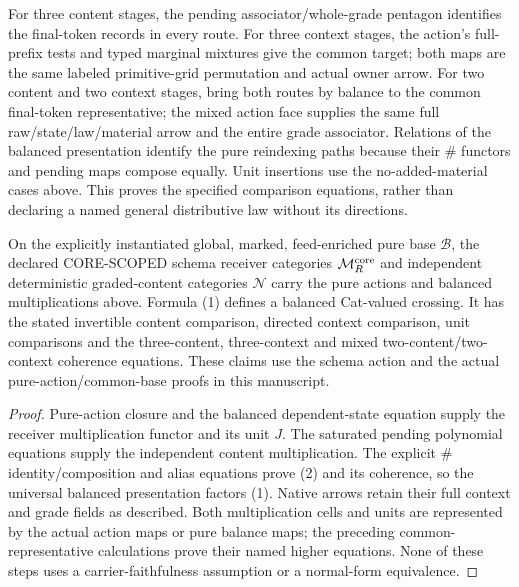 \documentclass[11pt]{article}
\begin{document}
For three content stages, the pending associator/whole-grade pentagon identifies the final-token records in every route. For three context stages, the action's full-prefix tests and typed marginal mixtures give the common target; both maps are the same labeled primitive-grid permutation and actual owner arrow. For two content and two context stages, bring both routes by balance to the common final-token representative; the mixed action face supplies the same full raw/state/law/material arrow and the entire grade associator. Relations of the balanced presentation identify the pure reindexing paths because their $\#$ functors and pending maps compose equally. Unit insertions use the no-added-material cases above. This proves the specified comparison equations, rather than declaring a named general distributive law without its directions.

\begin{theorem}
On the explicitly instantiated global, marked, feed-enriched pure base $\mathcal B$, the declared CORE-SCOPED schema receiver categories $\mathcal M_R^{\rm core}$ and independent deterministic graded-content categories $\mathcal N$ carry the pure actions and balanced multiplications above. Formula (1) defines a balanced Cat-valued crossing. It has the stated invertible content comparison, directed context comparison, unit comparisons and the three-content, three-context and mixed two-content/two-context coherence equations. These claims use the schema action and the actual pure-action/common-base proofs in this manuscript.
\end{theorem}
\begin{proof}
Pure-action closure and the balanced dependent-state equation supply the receiver multiplication functor and its unit $J$. The saturated pending polynomial equations supply the independent content multiplication. The explicit $\#$ identity/composition and alias equations prove (2) and its coherence, so the universal balanced presentation factors (1). Native arrows retain their full context and grade fields as described. Both multiplication cells and units are represented by the actual action maps or pure balance maps; the preceding common-representative calculations prove their named higher equations. None of these steps uses a carrier-faithfulness assumption or a normal-form equivalence.\end{proof}
\end{document}
